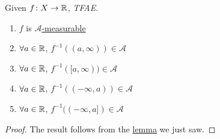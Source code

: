 \begin{lemma}\label{lma:lec10-2}
	Given \(f\colon X\to \mathbb{\MakeUppercase{r}} \), \emph{TFAE}.
	\begin{enumerate}
		\item \(f\) is \hyperref[def:A-measurable-function]{\(\mathcal{A}\)-measurable}
		\item \(\forall a\in\mathbb{\MakeUppercase{r}} \), \(f^{-1} ((a, \infty ))\in\mathcal{A} \)
		\item \(\forall a\in\mathbb{\MakeUppercase{r}} \), \(f^{-1} ([a, \infty ))\in\mathcal{A} \)
		\item \(\forall a\in\mathbb{\MakeUppercase{r}} \), \(f^{-1} ((-\infty, a))\in\mathcal{A} \)
		\item \(\forall a\in\mathbb{\MakeUppercase{r}} \), \(f^{-1} ((-\infty, a])\in\mathcal{A} \)
	\end{enumerate}
\end{lemma}
\begin{proof}
	The result follows from the \hyperref[lma:lec10-1]{lemma} we just saw.
\end{proof}

